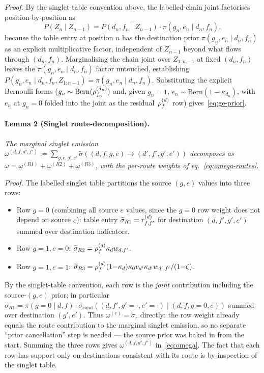\emph{Proof.} By the singlet-table convention above, the
labelled-chain joint factorises position-by-position as
\[
P(Z_n \mid Z_{n-1}) = P(d_n, f_n \mid Z_{n-1}) \cdot \pi(g_n, e_n \mid d_n, f_n),
\]
because the table entry at position $n$ has the destination prior
$\pi(g_n, e_n \mid d_n, f_n)$ as an explicit multiplicative factor,
independent of $Z_{n-1}$
beyond what flows through $(d_n, f_n)$. Marginalising the chain
joint over $Z_{1:n-1}$ at fixed $(d_n, f_n)$ leaves the
$\pi(g_n, e_n \mid d_n, f_n)$ factor untouched, establishing
$P(g_n, e_n \mid d_n, f_n, Z_{1:n-1}) = \pi(g_n, e_n \mid d_n, f_n)$.
Substituting the explicit Bernoulli forms
($g_n \sim \text{Bern}(\rho^{(d_n)}_{f_n})$ and, given $g_n = 1$,
$e_n \sim \text{Bern}(1 - \kappa_{d_n})$, with $e_n$ at $g_n = 0$
folded into the joint as the residual~$\rho^{(d)}_f$ row)
gives~\eqref{eq:ge-prior}. \qedhere

\paragraph{Lemma 2 (Singlet route-decomposition).}
\emph{The marginal singlet emission $\omega^{(d, f, d', f')} :=
\sum_{g, e, g', e'} \widetilde\sigma((d, f, g, e) \to (d', f', g', e'))$
decomposes as $\omega = \omega^{(R1)} + \omega^{(R2)} + \omega^{(R3)}$,
with the per-route weights of eq.~\eqref{eq:omega-routes}.}

\emph{Proof.} The labelled singlet table partitions the source
$(g, e)$ values into three rows:
\begin{itemize}[nosep]
\item Row $g{=}0$ (combining all source $e$ values, since the
$g{=}0$ row weight does not depend on source $e$): table entry
$\widetilde\sigma_{R1} = r^{(d)}_{f, f'}$ for destination
$(d, f', g', e')$ summed over destination indicators.
\item Row $g{=}1, e{=}0$: $\widetilde\sigma_{R2} = \rho^{(d)}_f
\kappa_d w_{d, f'}$.
\item Row $g{=}1, e{=}1$: $\widetilde\sigma_{R3} = \rho^{(d)}_f
(1{-}\kappa_d) \kappa_0 v_{d'} \kappa_{d'} w_{d', f'}
/ (1{-}\zeta)$.
\end{itemize}
By the singlet-table convention, each row is the \emph{joint}
contribution including the source-$(g, e)$ prior; in particular
$\widetilde\sigma_{R1} = \pi(g{=}0 \mid d, f) \cdot
\sigma_{\text{cond}}((d, f', g'{=}\cdot, e'{=}\cdot) \mid (d, f,
g{=}0, e))$ summed over destination $(g', e')$. Thus
$\omega^{(r)} = \widetilde\sigma_r$ directly: the row weight already
equals the route contribution to the marginal singlet emission, so
no separate ``prior cancellation'' step is needed --- the source
prior was baked in from the start. Summing the three rows gives
$\omega^{(d, f, d', f')}$ in~\eqref{eq:omega}. The fact that
each row has support only on destinations consistent with its
route is by inspection of the singlet table. \qedhere

